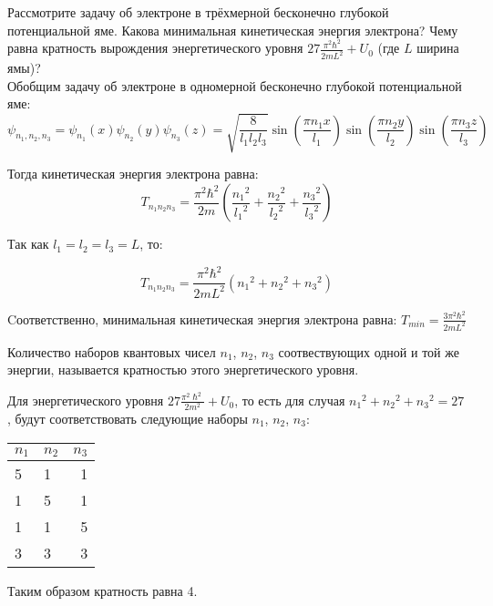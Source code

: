 \documentclass[__main__.tex]{subfiles}
\begin{document}
Рассмотрите задачу об электроне в трёхмерной бесконечно глубокой потенциальной яме. Какова минимальная кинетическая энергия электрона? Чему равна кратность вырождения энергетического уровня $27\frac{\pi^2\hbar^2}{2mL^2}+U_0$ (где $L$ ширина ямы)?\\ 

Обобщим задачу об электроне в одномерной бесконечно глубокой потенциальной яме:\\

$$\psi_{{n_1},{n_2},{n_3}}=\psi_{n_1}(x)\psi_{n_2}(y)\psi_{n_3}(z) = \sqrt{\frac{8}{l_1 l_2 l_3}} \sin\left(\frac{\pi n_1 x}{l_1}\right) \sin\left(\frac{\pi n_2 y}{l_2}\right) \sin\left(\frac{\pi n_3 z}{l_3}\right)$$

Тогда кинетическая энергия электрона равна:
$$T_{n_1 n_2 n_3} = \frac{\pi^2\hbar^2}{2m}\left(\frac{{n_1}^2}{{l_1}^2} + \frac{{n_2}^2}{{l_2}^2} + \frac{{n_3}^2}{{l_3}^2}\right)$$

Так как $l_1 = l_2 = l_3 = L$, то: 

$$T_{n_1 n_2 n_3} =  \frac{\pi^2\hbar^2}{2m L^2}\left({n_1}^2 + {n_2}^2 + {n_3}^2\right)$$

Cоответственно, минимальная кинетическая энергия электрона равна: $T_{min} =   \frac{3\pi^2\hbar^2}{2m L^2}$\\

\begin {definition}
Количество наборов квантовых чисел $n_1$, $n_2$, $n_3$ соотвествующих одной и той же энергии, называется кратностью этого энергетического уровня.
\end {definition}

Для энергетического уровня $ 27 \frac{\pi^2\hslash^2}{2m^2} + U_0$, то есть для случая ${n_1}^2 + {n_2}^2 + {n_3}^2 = 27$ , будут соответствовать следующие наборы  $n_1$, $n_2$, $n_3$:

\begin {table}[h]
\centering
\begin {tabular}{llr}
\toprule
$n_1$ & $n_2$ & $n_3$ \\
\midrule
5 & 1 & 1 \\
1 & 5 & 1 \\
1 & 1 & 5 \\
3 & 3 & 3 \\
\bottomrule
\end {tabular}
\end {table}

Таким образом кратность равна 4.

\end{document}
